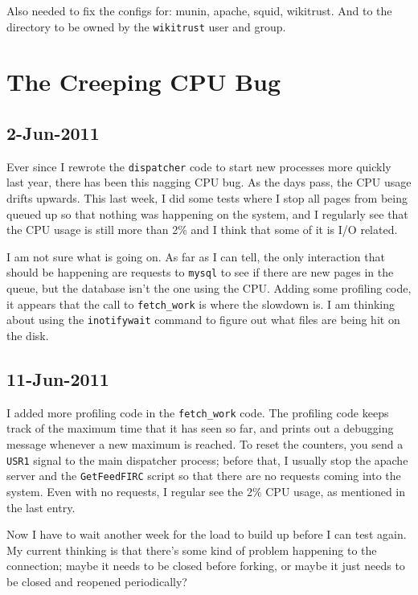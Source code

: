 Also needed to fix the configs for: munin, apache, squid, wikitrust.
And to  the directory to be owned by the \texttt{wikitrust}
user and group.

\section{The Creeping CPU Bug}

\subsection{2-Jun-2011}

Ever since I rewrote the \texttt{dispatcher} code to start
new processes more quickly last year, there has been this
nagging CPU bug.
As the days pass, the CPU usage drifts upwards.
This last week, I did some tests where I stop all pages from being
queued up so that nothing was happening on the system, and I
regularly see that the CPU usage is still more than 2\%
and I think that some of it is I/O related.

I am not sure what is going on.
As far as I can tell, the only interaction that should be happening
are requests to \texttt{mysql} to see if there are new pages in the
queue, but the database isn't the one using the CPU.
Adding some profiling code, it appears that the call to
\texttt{fetch\_work} is where the slowdown is.
I am thinking about using the \texttt{inotifywait} command
to figure out what files are being hit on the disk.

\subsection{11-Jun-2011}

I added more profiling code in the \texttt{fetch\_work} code.
The profiling code keeps track of the maximum time that it has
seen so far, and prints out a debugging message whenever a
new maximum is reached.
To reset the counters, you send a \texttt{USR1} signal to the
main dispatcher process; before that, I usually stop the apache
server and the \texttt{GetFeedFIRC} script so that there are
no requests coming into the system.
Even with no requests, I regular see the 2\% CPU usage,
as mentioned in the last entry.

Now I have to wait another week for the load to build up
before I can test again.
My current thinking is that there's some kind of
problem happening to the \mysql connection; maybe
it needs to be closed before forking, or maybe it just
needs to be closed and reopened periodically?


